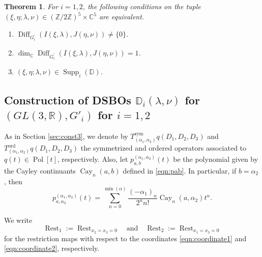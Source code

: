 \documentclass[a4paper,11pt,reqno]{amsart}
\newcommand{\DD}{\mathbb{D}}
\newcommand{\0}{{\bf 0}}
\newcommand{\Z}{\mathbb{Z}}
\newcommand{\R}{\mathbb{R}}
\newcommand{\C}{\mathbb{C}}
\newcommand{\1}{{\bf 1}}
\DeclareMathOperator{\Cay}{Cay}
\DeclareMathOperator{\Pol}{Pol}
\newcommand{\ord}{{\mathrm{ord}}}
\DeclareMathOperator{\Supp}{Supp}
\DeclareMathOperator{\Diff}{Diff}
\DeclareMathOperator{\Rest}{Rest}
\theoremstyle{plain}
\newtheorem{theorem}[equation]{Theorem}
\theoremstyle{definition}
\numberwithin{equation}{section}
\theoremstyle{definition}
\begin{document}
\begin{theorem}
\label{thm:class1}
For $i=1,2$, 
the following conditions on the tuple $(\xi, \eta; \lambda, \nu) \in (\Z/2\Z)^5 \times \C^5$ are equivalent.
\begin{enumerate}[label = \normalfont{(\roman*)}]
    \item $\Diff_{G_i^\prime}\left(I(\xi, \lambda), J(\eta, \nu)\right) \neq \{0\}$.
    
    \item $\dim_\C \Diff_{G_i^\prime}\left(I(\xi, \lambda), J(\eta, \nu)\right) = 1$.

    \item $(\xi, \eta; \lambda, \nu) \in \Supp_i(\DD)$. 
\end{enumerate}
\end{theorem}

\subsection{Construction of DSBOs 
\texorpdfstring{$\DD_i(\lambda,\nu)$}{D_i(λ,ν)} for \texorpdfstring{$(GL(3, \R), G'_i)$}{(GL(3,R),G_i')} for \texorpdfstring{$i=1,2$}{i=1,2}} 
\label{sec:const12}

As in Section \ref{sec:const3}, we denote by 
$T^{\mathrm{sym}}_{(\alpha_1, \alpha_2)} q(D_1, D_2, D_3)$
and
$T^\ord_{(\alpha_1, \alpha_2)} q(D_1, D_2, D_3)$ 
the  symmetrized and ordered operators
associated to $q(t) \in \Pol[t]$, respectively.
Also, let $p_{a,b}^{(\alpha_1,\alpha_2)}(t)$ be the polynomial given by the Cayley 
continuants $\Cay_n(a,b)$  defined in \eqref{eqn:pab}.
In particular, if $b=\alpha_2$, then
\begin{equation}\label{eqn:p_alpha}
p_{a,\alpha_2}^{(\alpha_1, \alpha_2)}(t) = 
\sum_{n=0}^{\min(\alpha)} 
\frac{(-\alpha_1)_n}{2^n n! }\Cay_n(a,\alpha_2)t^n.
\end{equation}

We write 
\[
\Rest_1:=\Rest_{x_2=x_3=0} \quad \text{and}\quad \Rest_2:=\Rest_{x_1=x_3=0}
\]
for the restriction maps with respect to the coordinates
\eqref{eqn:coordinate1} and \eqref{eqn:coordinate2}, respectively.
\end{document}

